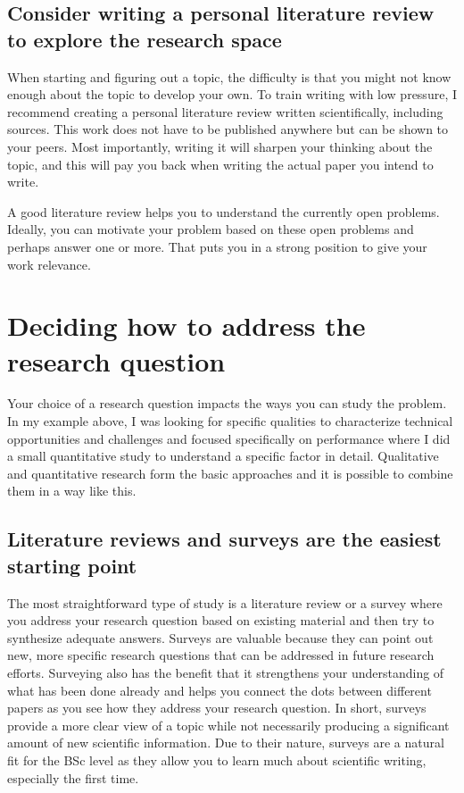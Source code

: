 \subsection{Consider writing a personal literature review to explore the research space}

When starting and figuring out a topic, the difficulty is that you might not know enough about the topic to develop your own.
To train writing with low pressure, I recommend creating a personal literature review written scientifically, including sources.
This work does not have to be published anywhere but can be shown to your peers.
Most importantly, writing it will sharpen your thinking about the topic, and this will pay you back when writing the actual paper you intend to write.

A good literature review helps you to understand the currently open problems.
Ideally, you can motivate your problem based on these open problems and perhaps answer one or more.
That puts you in a strong position to give your work relevance.

\section{Deciding how to address the research question}

Your choice of a research question impacts the ways you can study the problem.
In my example above, I was looking for specific qualities to characterize technical opportunities and challenges and focused specifically on performance where I did a small quantitative study to understand a specific factor in detail.
Qualitative and quantitative research form the basic approaches and it is possible to combine them in a way like this.


\subsection{Literature reviews and surveys are the easiest starting point}

The most straightforward type of study is a literature review or a survey where you address your research question based on existing material and then try to synthesize adequate answers.
Surveys are valuable because they can point out new, more specific research questions that can be addressed in future research efforts.
Surveying also has the benefit that it strengthens your understanding of what has been done already and helps you connect the dots between different papers as you see how they address your research question.
In short, surveys provide a more clear view of a topic while not necessarily producing a significant amount of new scientific information.
Due to their nature, surveys are a natural fit for the BSc level as they allow you to learn much about scientific writing, especially the first time.

